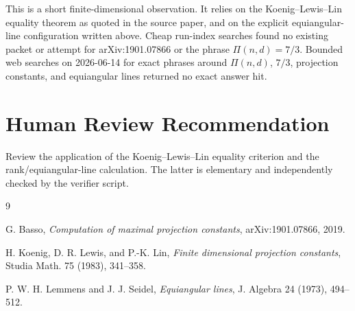 \documentclass[11pt]{article}
\begin{document}
This is a short finite-dimensional observation.  It relies on the
Koenig--Lewis--Lin equality theorem as quoted in the source paper, and on the
explicit equiangular-line configuration written above.  Cheap run-index
searches found no existing packet or attempt for arXiv:1901.07866 or the
phrase \(\Pi(n,d)=7/3\).  Bounded web searches on 2026-06-14 for exact
phrases around \(\Pi(n,d)\), \(7/3\), projection constants, and equiangular
lines returned no exact answer hit.

\section*{Human Review Recommendation}

Review the application of the Koenig--Lewis--Lin equality criterion and the
rank/equiangular-line calculation.  The latter is elementary and independently
checked by the verifier script.

\begin{thebibliography}{9}

G. Basso,
\emph{Computation of maximal projection constants},
arXiv:1901.07866, 2019.

H. Koenig, D. R. Lewis, and P.-K. Lin,
\emph{Finite dimensional projection constants},
Studia Math. 75 (1983), 341--358.

P. W. H. Lemmens and J. J. Seidel,
\emph{Equiangular lines},
J. Algebra 24 (1973), 494--512.

\end{thebibliography}
\end{document}
